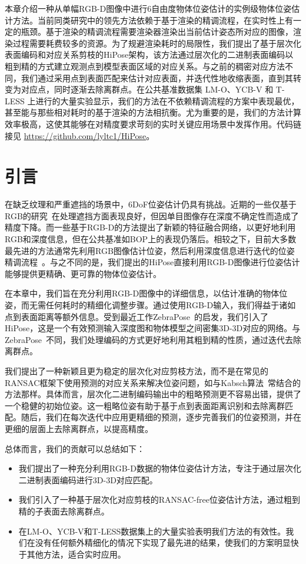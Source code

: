 本章介绍一种从单幅RGB-D图像中进行6自由度物体位姿估计的实例级物体位姿估计方法。当前同类研究中的领先方法依赖于基于渲染的精调流程，在实时性上有一定的瓶颈。基于渲染的精调流程需要渲染器渲染出当前估计姿态所对应的图像，渲染过程需要耗费较多的资源。为了规避渲染耗时的局限性，我们提出了基于层次化表面编码和对应关系剪枝的HiPose架构，该方法通过层次化的二进制表面编码以粗到精的方式建立观测点到模型表面区域的对应关系。与之前的稠密对应方法不同，我们通过采用点到表面匹配来估计对应表面，并迭代性地收缩表面，直到其转变为对应点，同时逐渐去除离群点。在公共基准数据集 LM-O、YCB-V 和 T-LESS 上进行的大量实验显示，我们的方法在不依赖精调流程的方案中表现最优，甚至能与那些相对耗时的基于渲染的方法相抗衡。尤为重要的是，我们的方法计算效率极高，这使其能够在对精度要求苛刻的实时关键应用场景中发挥作用。代码链接见 \url{https://github.com/lyltc1/HiPose}。

\section{引言}
在缺乏纹理和严重遮挡的场景中，6DoF位姿估计仍具有挑战。近期的一些仅基于RGB的研究~\cite{zakharov2019dpod,park2019pix2pose,su2022zebrapose}在处理遮挡方面表现良好，但因单目图像存在深度不确定性而造成了精度下降。而一些基于RGB-D的方法\cite{wang2019densefusion, he2020pvn3d,he2021ffb6d,zhou2023deep}提出了新颖的特征融合网络，以更好地利用RGB和深度信息，但在公共基准如BOP\cite{Sundermeyer2023BOPC2}上的表现仍落后。相较之下，目前大多数最先进的方法通常先利用RGB图像估计位姿，然后利用深度信息进行迭代的位姿精调流程~\cite{Rusinkiewicz2001EfficientVO,lipson2022coupled}。与之不同的是，我们提出的HiPose直接利用RGB-D图像进行位姿估计能够提供更精确、更可靠的物体位姿估计。

在本章中，我们旨在充分利用RGB-D图像中的详细信息，以估计准确的物体位姿，而无需任何耗时的精细化调整步骤。通过使用RGB-D输入，我们得益于诸如点到表面距离等额外信息。受到最近工作ZebraPose~\cite{su2022zebrapose}的启发，我们引入了HiPose，这是一个有效预测输入深度图和物体模型之间密集3D-3D对应的网络。与ZebraPose~\cite{su2022zebrapose}不同，我们处理编码的方式更好地利用其粗到精的性质，通过迭代去除离群点。

我们提出了一种新颖且更为稳定的层次化对应剪枝方法，而不是在常见的RANSAC框架下使用预测的对应关系来解决位姿问题，如与Kabsch算法~\cite{umeyama1991least}常结合的方法那样。具体而言，层次化二进制编码输出中的粗略预测更不容易出错，提供了一个稳健的初始位姿。这一粗略位姿有助于基于点到表面距离识别和去除离群匹配。随后，我们在每次迭代中应用更精细的预测，逐步完善我们的位姿预测，并在更细的层面上去除离群点，以提高精度。

总体而言，我们的贡献可以总结如下：
\begin{itemize}
\item 我们提出了一种充分利用RGB-D数据的物体位姿估计方法，专注于通过层次化二进制表面编码进行3D-3D对应匹配。
\item 我们引入了一种基于层次化对应剪枝的RANSAC-free位姿估计方法，通过粗到精的子表面去除离群点。
\item 在LM-O、YCB-V和T-LESS数据集上的大量实验表明我们方法的有效性。我们在没有任何额外精细化的情况下实现了最先进的结果，使我们的方案明显快于其他方法，适合实时应用。
\end{itemize}
